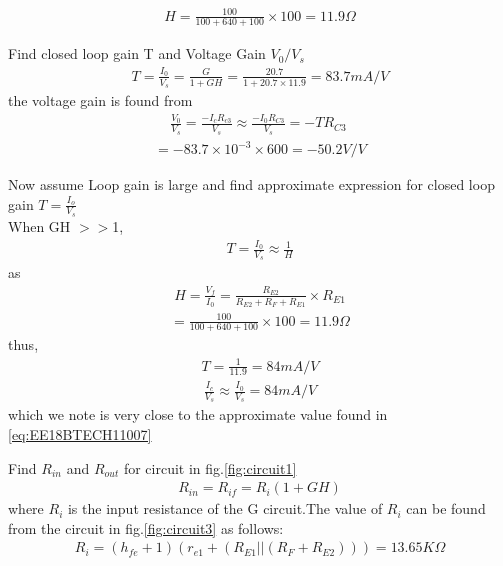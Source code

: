 \begin{enumerate}[label=\thesubsection.\arabic*.,ref=\thesubsection.\theenumi]
{\begin{align}
   H =\frac{100}{100+640+100}\times 100=11.9\Omega
\end{align}
\item Find closed loop gain T and Voltage Gain $V_0/V_s$
\\ \solution
 \begin{align}
 \label{eq:EE18BTECH11007}
    T=\frac{I_0}{V_s}=\frac{G}{1+GH}=\frac{20.7}{1+20.7\times11.9}=83.7mA/V
\end{align}
 the voltage gain is found from 
\begin{align}
    \frac{V_0}{V_s}=\frac{-I_cR_{c3}}{V_s}\approx\frac{-I_0R_{C3}}{V_s}=-TR_{C3}
    \
\end{align}
\begin{align}
    =-83.7\times10^{-3}\times600=-50.2V/V
\end{align}
\item Now assume Loop gain is large and find approximate expression for closed loop gain $T=\frac{I_o}{V_s}$
\\
\solution When GH $>>$1,
\begin{align}
    T =\frac{I_0}{V_s}\approx \frac{1}{H}
\end{align}
as
\begin{align}
    H=\frac{V_f}{I_0}=\frac{R_{E2}}{R_{E2}+R_F+R_{E1}} \times R_{E1}
\end{align}
\begin{align}
    =\frac{100}{100+640+100}\times 100=11.9\Omega
\end{align}
thus,
\begin{align}
   T =\frac{1}{11.9}=84mA/V
\end{align}
\begin{align}
 \frac{I_c}{V_s}\approx\frac{I_0}{V_s}=84 mA/V
 \end{align}
 which  we note is very close to the approximate value found in \eqref{eq:EE18BTECH11007} 
\item Find $R_{in}$ and $R_{out}$ for circuit in  fig.\ref{fig:circuit1}
\\
\solution
\begin{align}
    R_{in} =R_{if}=R_i(1+GH)
\end{align}
where $R_i$ is the input resistance of the G circuit.The value of $R_i$ can be found from the circuit in fig.\ref{fig:circuit3} as follows:
\begin{align}
    R_i=(h_{fe}+1)(r_{e1}+(R_{E1}||(R_F+R_{E2})))=13.65K\Omega
\end{align} 
\begin{align}

\end{align}}
\end{enumerate}
